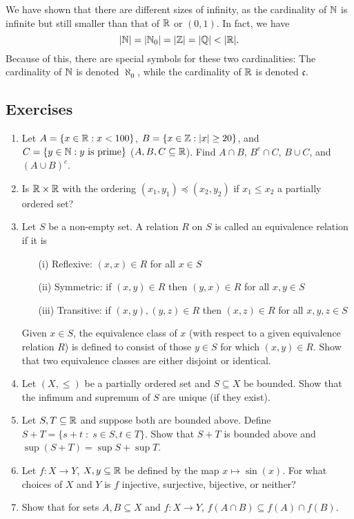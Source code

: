 \documentclass{article}
\begin{document}
We have shown that there are different sizes of infinity, as the cardinality of ${\mathbb{N}}$ is infinite but still smaller than that of ${\mathbb{R}}$ or $(0,1)$. In fact, we have
$$ |{\mathbb{N}}| = |{\mathbb{N}}_0| = |{\mathbb{Z}}| = |{\mathbb{Q}}| < | {\mathbb{R}}|.$$
Because of this, there are special symbols for these two cardinalities: The cardinality of ${\mathbb{N}}$ is denoted $\aleph_0$, while the cardinality of ${\mathbb{R}}$ is denoted $\mathfrak{c}$. 
\subsection{Exercises}
\begin{enumerate}
	\item Let $A = \{x\in {\mathbb{R}} : x <100\}$, $B = \{x\in {\mathbb{Z}} : |x| \geq 20\}$, and $C = \{y \in {\mathbb{N}} : y \text{ is prime}\}$ ($A,B,C \subseteq {\mathbb{R}}$). Find $A \cap B$, $B^c \cap C$, $B \cup C$, and $(A \cup B )^c$.
    \item Is ${\mathbb{R}} \times {\mathbb{R}}$ with the ordering $(x_1,y_1) \preceq (x_2,y_2)$ if $x_1 \leq x_2$ a partially ordered set? 
     \item \cite[Exercise 1.3.1]{tastetopology} Let $S$ be a non-empty set. A relation $R$ on $S$ is called an equivalence relation if it is
    \begin{enumerate}
        \item[(i)] Reflexive: $(x,x) \in R$ for all $x \in S$
        \item[(ii)] Symmetric: if $(x,y) \in R$  then $(y,x) \in R$ for all $x,y \in S$
        \item[(iii)] Transitive: if $(x,y), (y,z) \in R$ then $(x,z) \in R$ for all $x,y,z \in S$
    \end{enumerate}
Given $x \in S$, the equivalence class of $x$ (with respect to a given equivalence relation $R$) is defined to consist of those $y \in S$ for which $(x,y) \in R$. Show that two equivalence classes are either disjoint or identical.
    \item Let $(X, \leq)$ be a partially ordered set and $S\subseteq X$ be bounded. Show that the infimum and supremum of $S$ are unique (if they exist).
    \item Let $S,T \subseteq {\mathbb{R}}$ and suppose both are bounded above. Define $S+T = \{s + t \; \colon \; s\in S,t\in T\}$. Show that $S+T$ is bounded above and $\sup(S+T) = \sup S + \sup T$. 
    \item Let $f: X \to Y$, $X, y \subseteq {\mathbb{R}}$ be defined by the map $x \mapsto \sin(x)$. For what choices of $X$ and $Y$ is $f$ injective, surjective, bijective, or neither?
    \item Show that for sets $A,B \subseteq X$ and $f: X \to Y$, $f(A \cap B) \subseteq f(A) \cap f(B)$.

\end{enumerate}
\end{document}
